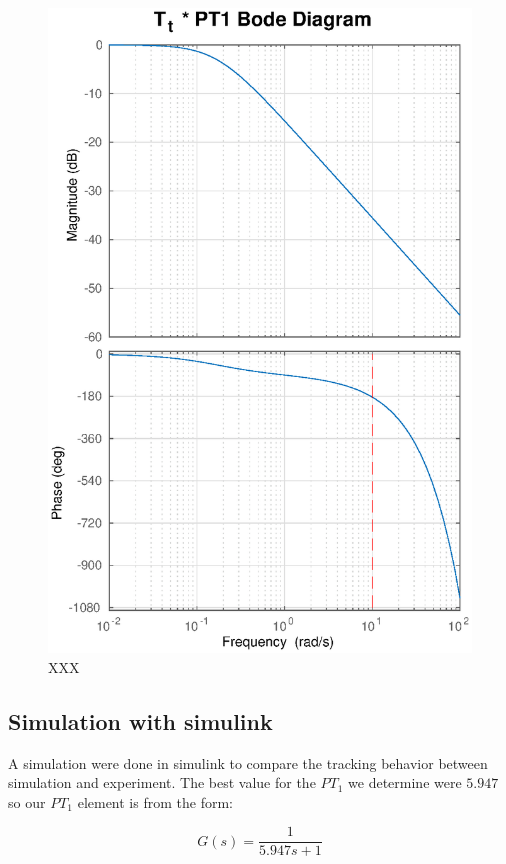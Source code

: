 \begin{figure}
    \centering
    \includegraphics[width=\linewidth]{images/Tt_PT1_bode}
    \caption{XXX}
\end{figure}


\subsection{Simulation with simulink}

A simulation were done in  simulink  to  compare the tracking behavior between
simulation and  experiment.  The best value for the $PT_{1}$ we determine were
$5.947$ so our $PT_{1}$ element is from the form:

\begin{equation}
    G(s) = \frac{1}{5.947s+1}
\end{equation}

